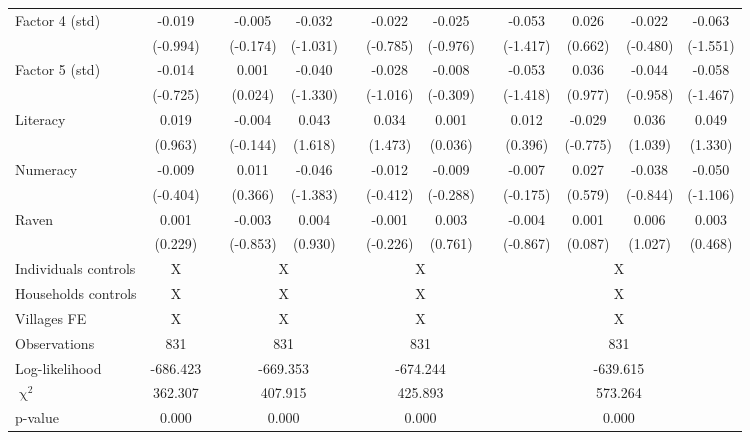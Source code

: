 \begin{table}[htbp]
{\begin{tabular}{lcccccccccccc}
    Factor 4 (std) & -0.019 &       & -0.005 & -0.032 &       & -0.022 & -0.025 &       & -0.053 & 0.026 & -0.022 & -0.063 \\
          & (-0.994) &       & (-0.174) & (-1.031) &       & (-0.785) & (-0.976) &       & (-1.417) & (0.662) & (-0.480) & (-1.551) \\
    Factor 5 (std) & -0.014 &       & 0.001 & -0.040 &       & -0.028 & -0.008 &       & -0.053 & 0.036 & -0.044 & -0.058 \\
          & (-0.725) &       & (0.024) & (-1.330) &       & (-1.016) & (-0.309) &       & (-1.418) & (0.977) & (-0.958) & (-1.467) \\
    Literacy & 0.019 &       & -0.004 & 0.043 &       & 0.034 & 0.001 &       & 0.012 & -0.029 & 0.036 & 0.049 \\
          & (0.963) &       & (-0.144) & (1.618) &       & (1.473) & (0.036) &       & (0.396) & (-0.775) & (1.039) & (1.330) \\
    Numeracy & -0.009 &       & 0.011 & -0.046 &       & -0.012 & -0.009 &       & -0.007 & 0.027 & -0.038 & -0.050 \\
          & (-0.404) &       & (0.366) & (-1.383) &       & (-0.412) & (-0.288) &       & (-0.175) & (0.579) & (-0.844) & (-1.106) \\
    Raven & 0.001 &       & -0.003 & 0.004 &       & -0.001 & 0.003 &       & -0.004 & 0.001 & 0.006 & 0.003 \\
          & (0.229) &       & (-0.853) & (0.930) &       & (-0.226) & (0.761) &       & (-0.867) & (0.087) & (1.027) & (0.468) \\
    \midrule
    Individuals controls & X     &       & \multicolumn{2}{c}{X} &       & \multicolumn{2}{c}{X} &       & \multicolumn{4}{c}{X} \\
    Households controls & X     &       & \multicolumn{2}{c}{X} &       & \multicolumn{2}{c}{X} &       & \multicolumn{4}{c}{X} \\
    Villages FE & X     &       & \multicolumn{2}{c}{X} &       & \multicolumn{2}{c}{X} &       & \multicolumn{4}{c}{X} \\
    \midrule
    Observations & 831   &       & \multicolumn{2}{c}{831} &       & \multicolumn{2}{c}{831} &       & \multicolumn{4}{c}{831} \\
    Log-likelihood & -686.423 &       & \multicolumn{2}{c}{-669.353} &       & \multicolumn{2}{c}{-674.244} &       & \multicolumn{4}{c}{-639.615} \\
    $\upchi^2$ & 362.307 &       & \multicolumn{2}{c}{407.915} &       & \multicolumn{2}{c}{425.893} &       & \multicolumn{4}{c}{573.264} \\
    p-value & 0.000 &       & \multicolumn{2}{c}{0.000} &       & \multicolumn{2}{c}{0.000} &       & \multicolumn{4}{c}{0.000} \\
    \bottomrule

    \end{tabular}%
    }
  \label{tab:ame_debtpath}%
\end{table}%

